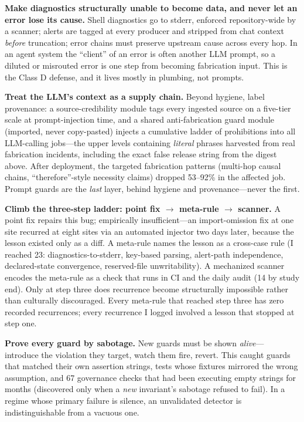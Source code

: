 \documentclass[10pt,journal]{IEEEtran}
\begin{document}
\textbf{Make diagnostics structurally unable to become data, and never let an
error lose its cause.} Shell diagnostics go to stderr, enforced
repository-wide by a scanner; alerts are tagged at every producer and stripped
from chat context \emph{before} truncation; error chains must preserve upstream
cause across every hop. In an agent system the ``client'' of an error is often
another LLM prompt, so a diluted or misrouted error is one step from becoming
fabrication input. This is the Class D defense, and it lives mostly in
plumbing, not prompts.

\textbf{Treat the LLM's context as a supply chain.} Beyond hygiene, label
provenance: a source-credibility module tags every ingested source on a
five-tier scale at prompt-injection time, and a shared anti-fabrication guard
module (imported, never copy-pasted) injects a cumulative ladder of
prohibitions into all LLM-calling jobs---the upper levels containing
\emph{literal} phrases harvested from real fabrication incidents, including the
exact false release string from the digest above. After deployment, the
targeted fabrication patterns (multi-hop causal chains, ``therefore''-style
necessity claims) dropped 53--92\% in the affected job. Prompt guards are the
\emph{last} layer, behind hygiene and provenance---never the first.

\textbf{Climb the three-step ladder: point fix $\rightarrow$ meta-rule
$\rightarrow$ scanner.} A point fix repairs this bug; empirically
insufficient---an import-omission fix at one site recurred at eight sites via an
automated injector two days later, because the lesson existed only as a diff. A
meta-rule names the lesson as a cross-case rule (I reached 23:
diagnostics-to-stderr, key-based parsing, alert-path independence,
declared-state convergence, reserved-file unwritability). A mechanized scanner
encodes the meta-rule as a check that runs in CI and the daily audit (14 by
study end). Only at step three does recurrence become structurally impossible
rather than culturally discouraged. Every meta-rule that reached step three has
zero recorded recurrences; every recurrence I logged involved a lesson that
stopped at step one.

\textbf{Prove every guard by sabotage.} New guards must be shown \emph{alive}---
introduce the violation they target, watch them fire, revert. This caught
guards that matched their own assertion strings, tests whose fixtures mirrored
the wrong assumption, and 67 governance checks that had been executing empty
strings for months (discovered only when a \emph{new} invariant's sabotage
refused to fail). In a regime whose primary failure is silence, an unvalidated
detector is indistinguishable from a vacuous one.
\end{document}
